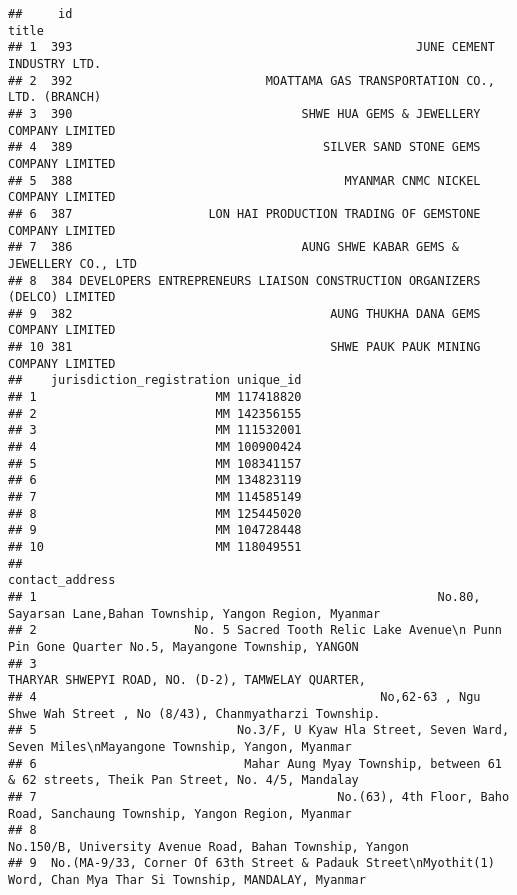 \documentclass[
]{article}
\begin{document}
\begin{verbatim}
##     id                                                                    title
## 1  393                                                JUNE CEMENT INDUSTRY LTD.
## 2  392                           MOATTAMA GAS TRANSPORTATION CO., LTD. (BRANCH)
## 3  390                                SHWE HUA GEMS & JEWELLERY COMPANY LIMITED
## 4  389                                   SILVER SAND STONE GEMS COMPANY LIMITED
## 5  388                                      MYANMAR CNMC NICKEL COMPANY LIMITED
## 6  387                   LON HAI PRODUCTION TRADING OF GEMSTONE COMPANY LIMITED
## 7  386                                AUNG SHWE KABAR GEMS & JEWELLERY CO., LTD
## 8  384 DEVELOPERS ENTREPRENEURS LIAISON CONSTRUCTION ORGANIZERS (DELCO) LIMITED
## 9  382                                    AUNG THUKHA DANA GEMS COMPANY LIMITED
## 10 381                                    SHWE PAUK PAUK MINING COMPANY LIMITED
##    jurisdiction_registration unique_id
## 1                         MM 117418820
## 2                         MM 142356155
## 3                         MM 111532001
## 4                         MM 100900424
## 5                         MM 108341157
## 6                         MM 134823119
## 7                         MM 114585149
## 8                         MM 125445020
## 9                         MM 104728448
## 10                        MM 118049551
##                                                                                                      contact_address
## 1                                                        No.80, Sayarsan Lane,Bahan Township, Yangon Region, Myanmar
## 2                      No. 5 Sacred Tooth Relic Lake Avenue\n Punn Pin Gone Quarter No.5, Mayangone Township, YANGON
## 3                                                                 THARYAR SHWEPYI ROAD, NO. (D-2), TAMWELAY QUARTER,
## 4                                                No,62-63 , Ngu Shwe Wah Street , No (8/43), Chanmyatharzi Township.
## 5                            No.3/F, U Kyaw Hla Street, Seven Ward, Seven Miles\nMayangone Township, Yangon, Myanmar
## 6                             Mahar Aung Myay Township, between 61 & 62 streets, Theik Pan Street, No. 4/5, Mandalay
## 7                                          No.(63), 4th Floor, Baho Road, Sanchaung Township, Yangon Region, Myanmar
## 8                                                           No.150/B, University Avenue Road, Bahan Township, Yangon
## 9  No.(MA-9/33, Corner Of 63th Street & Padauk Street\nMyothit(1) Word, Chan Mya Thar Si Township, MANDALAY, Myanmar

\end{verbatim}
\end{document}
